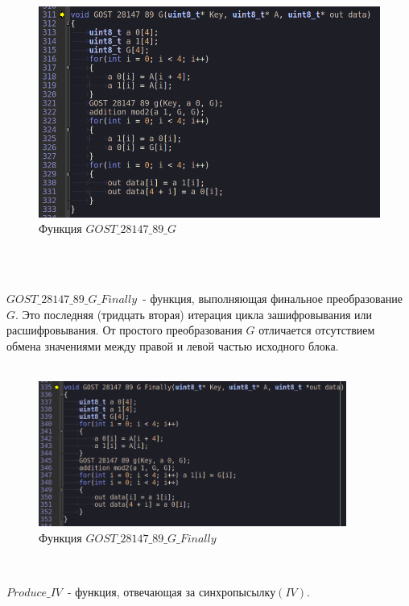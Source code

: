 \documentclass[oneside,final,14pt]{extreport}
\begin{document}
\begin{figure}[h!]
\includegraphics[width=1\textwidth]{14.png}
\caption{Функция $GOST\_28147\_89\_G$}
\end{figure}\\





~\


$GOST\_28147\_89\_G\_Finally$~- функция, выполняющая финальное преобразование $G$. Это последняя
(тридцать вторая) итерация цикла зашифровывания или расшифровывания. От простого преобразования $G$ отличается отсутствием обмена значениями между правой и левой частью исходного блока.\\

~\



\begin{figure}[h!]
\includegraphics[width=0.9\textwidth]{15.png}
\caption{Функция $GOST\_28147\_89\_G\_Finally$}
\end{figure}




~\



$Produce\_IV$~- функция, отвечающая за синхропысылку$(IV)$.\\
\end{document}
